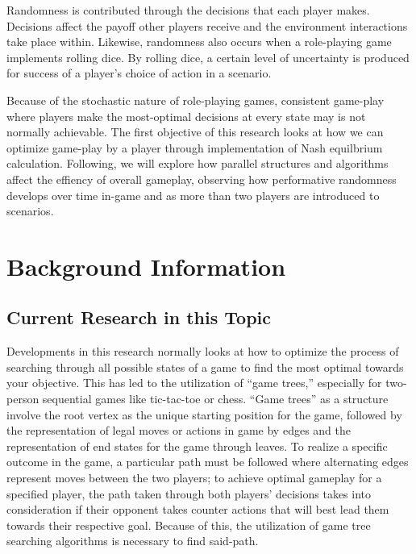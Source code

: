 \documentclass[conference]{IEEEtran}
\begin{document}
Randomness is contributed through the decisions that each player makes. Decisions affect the payoff other players receive and the environment interactions take place within. Likewise, randomness also occurs when a role-playing game implements rolling dice. By rolling dice, a certain level of uncertainty is produced for success of a player's choice of action in a scenario.

Because of the stochastic nature of role-playing games, consistent game-play where players make the most-optimal decisions at every state may is not normally achievable. The first objective of this research looks at how we can optimize game-play by a player through implementation of Nash equilbrium calculation. Following, we will explore how parallel structures and algorithms affect the effiency of overall gameplay, observing how performative randomness develops over time in-game and as more than two players are introduced to scenarios.

\section{Background Information}

\subsection{Current Research in this Topic}

Developments in this research normally looks at how to optimize the process of searching through all possible states of a game to find the most optimal towards your objective. This has led to the utilization of ``game trees,'' especially for two-person sequential games like tic-tac-toe or chess. ``Game trees'' as a structure involve the root vertex as the unique starting position for the game, followed by the representation of legal moves or actions in game by edges and the representation of end states for the game through leaves. To realize a specific outcome in the game,  a particular path must be followed where alternating edges represent moves between the two players; to achieve optimal gameplay for a specified player, the path taken through both players' decisions takes into consideration if their opponent takes counter actions that will best lead them towards their respective goal. Because of this, the utilization of game tree searching algorithms is necessary to find said-path.
\smallskip
\end{document}
